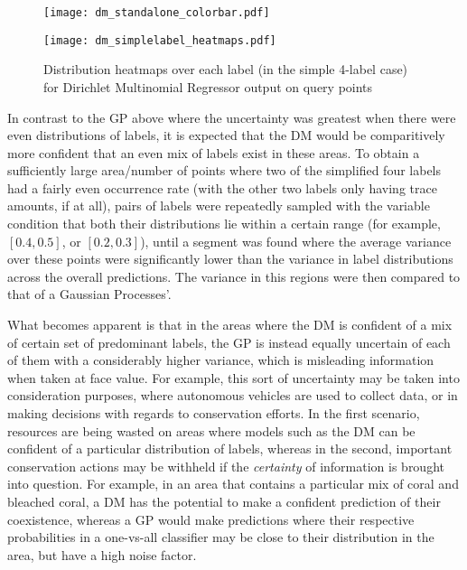 
\begin{figure}[H]
    \begin{minipage}{\linewidth}
        \centerline{\texttt{[image: dm\_standalone\_colorbar.pdf]}}
        \centerline{\texttt{[image: dm\_simplelabel\_heatmaps.pdf]}}
        \caption{Distribution heatmaps over each label (in the simple 4-label case) for Dirichlet Multinomial Regressor output on query points}
        \label{fig:dm_4label_heatmap}
    \end{minipage}
    \hfill
\end{figure}

In contrast to the GP above where the uncertainty was greatest when there were even distributions of labels, it is expected that the DM would be comparitively more confident that an even mix of labels exist in these areas. To obtain a sufficiently large area/number of points where two of the simplified four labels had a fairly even occurrence rate (with the other two labels only having trace amounts, if at all), pairs of labels were repeatedly sampled with the variable condition that both their distributions lie within a certain range (for example, $[0.4, 0.5]$, or $[0.2, 0.3]$), until a segment was found where the average variance over these points were significantly lower than the variance in label distributions across the overall predictions. The variance in this regions were then compared to that of a Gaussian Processes'.


What becomes apparent is that in the areas where the DM is confident of a mix of certain set of predominant labels, the GP is instead equally uncertain of each of them with a considerably higher variance, which is misleading information when taken at face value. For example, this sort of uncertainty may be taken into consideration purposes, where autonomous vehicles are used to collect data, or in making decisions with regards to conservation efforts. In the first scenario, resources are being wasted on areas where models such as the DM can be confident of a particular distribution of labels, whereas in the second, important conservation actions may be withheld if the \textit{certainty} of information is brought into question. For example, in an area that contains a particular mix of coral and bleached coral, a DM has the potential to make a confident prediction of their coexistence, whereas a GP would make predictions where their respective probabilities in a one-vs-all classifier may be close to their distribution in the area, but have a high noise factor.


